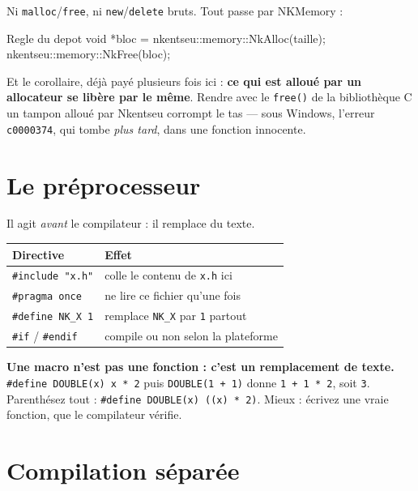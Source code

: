 \begin{nkpiege}
Ni \texttt{malloc}/\texttt{free}, ni \texttt{new}/\texttt{delete} bruts. Tout
passe par NKMemory :

\begin{nkcode}{Regle du depot}
void *bloc = nkentseu::memory::NkAlloc(taille);
nkentseu::memory::NkFree(bloc);
\end{nkcode}

Et le corollaire, déjà payé plusieurs fois ici : \textbf{ce qui est alloué par un
allocateur se libère par le même}. Rendre avec le \texttt{free()} de la
bibliothèque C un tampon alloué par Nkentseu corrompt le tas --- sous Windows,
l'erreur \texttt{c0000374}, qui tombe \emph{plus tard}, dans une fonction
innocente.
\end{nkpiege}

\section{Le préprocesseur}

Il agit \emph{avant} le compilateur : il remplace du texte.

\begin{center}
\begin{tabular}{@{}ll@{}}
\toprule
\textbf{Directive} & \textbf{Effet} \\
\midrule
\texttt{\#include "x.h"} & colle le contenu de \texttt{x.h} ici \\
\texttt{\#pragma once}   & ne lire ce fichier qu'une fois \\
\texttt{\#define NK\_X 1} & remplace \texttt{NK\_X} par \texttt{1} partout \\
\texttt{\#if} / \texttt{\#endif} & compile ou non selon la plateforme \\
\bottomrule
\end{tabular}
\end{center}

\begin{nkpiege}
\textbf{Une macro n'est pas une fonction : c'est un remplacement de texte.}
\texttt{\#define DOUBLE(x) x * 2} puis \texttt{DOUBLE(1 + 1)} donne
\texttt{1 + 1 * 2}, soit \texttt{3}. Parenthésez tout :
\texttt{\#define DOUBLE(x) ((x) * 2)}. Mieux : écrivez une vraie fonction, que le
compilateur vérifie.
\end{nkpiege}

\section{Compilation séparée}

